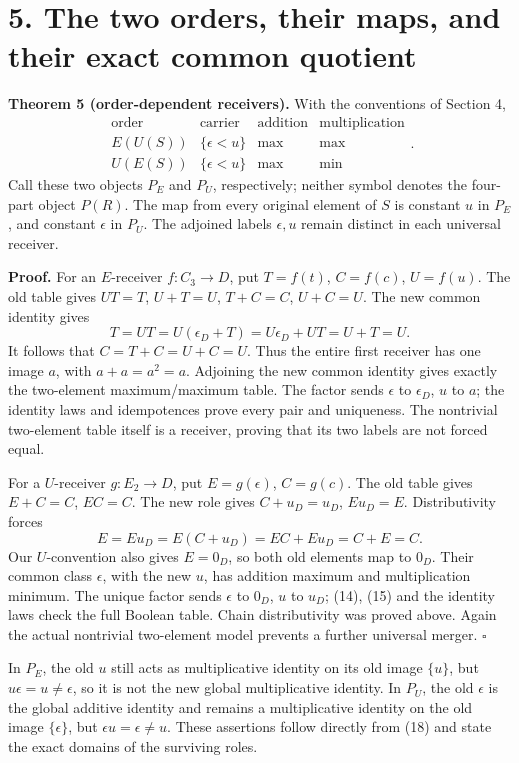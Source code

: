 \documentclass[
]{article}
\begin{document}
\section{5. The two orders, their maps, and their exact common
quotient}\label{the-two-orders-their-maps-and-their-exact-common-quotient}

\textbf{Theorem 5 (order-dependent receivers).} With the conventions of
Section 4, \[
\begin{array}{c|c|c|c}
\text{order}&\text{carrier}&\text{addition}&\text{multiplication}\\\hline
E(U(S))&\{\epsilon<u\}&\max&\max\\
U(E(S))&\{\epsilon<u\}&\max&\min
\end{array}.
\tag{18}
\] Call these two objects \(P_E\) and \(P_U\), respectively; neither
symbol denotes the four-part object \(P(R)\). The map from every
original element of \(S\) is constant \(u\) in \(P_E\), and constant
\(\epsilon\) in \(P_U\). The adjoined labels \(\epsilon,u\) remain
distinct in each universal receiver.

\textbf{Proof.} For an \(E\)-receiver \(f:C_3\to D\), put \(T=f(t)\),
\(C=f(c)\), \(U=f(u)\). The old table gives \(UT=T\), \(U+T=U\),
\(T+C=C\), \(U+C=U\). The new common identity gives \[
T=UT=U(\epsilon_D+T)=U\epsilon_D+UT=U+T=U.
\] It follows that \(C=T+C=U+C=U\). Thus the entire first receiver has
one image \(a\), with \(a+a=a^2=a\). Adjoining the new common identity
gives exactly the two-element maximum/maximum table. The factor sends
\(\epsilon\) to \(\epsilon_D\), \(u\) to \(a\); the identity laws and
idempotences prove every pair and uniqueness. The nontrivial two-element
table itself is a receiver, proving that its two labels are not forced
equal.

For a \(U\)-receiver \(g:E_2\to D\), put \(E=g(\epsilon)\), \(C=g(c)\).
The old table gives \(E+C=C\), \(EC=C\). The new role gives
\(C+u_D=u_D\), \(Eu_D=E\). Distributivity forces \[
E=Eu_D=E(C+u_D)=EC+Eu_D=C+E=C.
\tag{19}
\] Our \(U\)-convention also gives \(E=0_D\), so both old elements map
to \(0_D\). Their common class \(\epsilon\), with the new \(u\), has
addition maximum and multiplication minimum. The unique factor sends
\(\epsilon\) to \(0_D\), \(u\) to \(u_D\); (14), (15) and the identity
laws check the full Boolean table. Chain distributivity was proved
above. Again the actual nontrivial two-element model prevents a further
universal merger. \(\square\)

In \(P_E\), the old \(u\) still acts as multiplicative identity on its
old image \(\{u\}\), but \(u\epsilon=u\ne\epsilon\), so it is not the
new global multiplicative identity. In \(P_U\), the old \(\epsilon\) is
the global additive identity and remains a multiplicative identity on
the old image \(\{\epsilon\}\), but \(\epsilon u=\epsilon\ne u\). These
assertions follow directly from (18) and state the exact domains of the
surviving roles.
\end{document}
